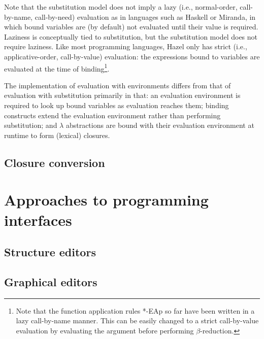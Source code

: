 Note that the substitution model does not imply a lazy (i.e., normal-order, call-by-name, call-by-need) evaluation \cite{plotkin1975call} as in languages such as Haskell or Miranda, in which bound variables are (by default) not evaluated until their value is required. Laziness is conceptually tied to substitution, but the substitution model does not require laziness. Like most programming languages, Hazel only has strict (i.e., applicative-order, call-by-value) evaluation: the expressions bound to variables are evaluated at the time of binding\footnote{Note that the function application rules *-EAp so far have been written in a lazy call-by-name manner. This can be easily changed to a strict call-by-value evaluation by evaluating the argument before performing $\beta$-reduction.}.


The implementation of evaluation with environments differs from that of evaluation with substitution primarily in that: an evaluation environment is required to look up bound variables as evaluation reaches them; binding constructs extend the evaluation environment rather than performing substitution; and $\lambda$ abstractions are bound with their evaluation environment at runtime to form (lexical) closures.

\subsection{Closure conversion}
\label{sec:closure-conversion}


\section{Approaches to programming interfaces}
\label{sec:prog-intf}


\subsection{Structure editors}
\label{sec:structure-editors}

\subsection{Graphical editors}
\label{sec:graphical-editors}


